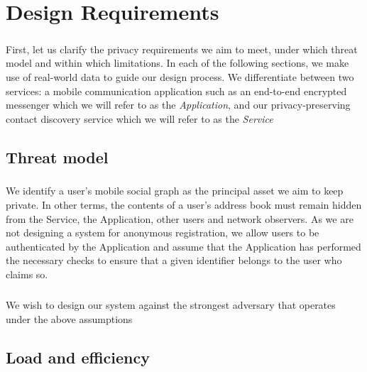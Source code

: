 \chapter{Design Requirements}

\paragraph{} First, let us clarify the privacy requirements we aim to meet, under which threat model and within which limitations. In each of the following sections, we make use of real-world data to guide our design process. We differentiate between two services: a mobile communication application such as an end-to-end encrypted messenger which we will refer to as the \textit{Application}, and our privacy-preserving contact discovery service which we will refer to as the \textit{Service}

\section{Threat model}

\paragraph{} We identify a user's mobile social graph as the principal asset we aim to keep private. In other terms, the contents of a user's address book must remain hidden from the Service, the Application, other users and network observers. As we are not designing a system for anonymous registration, we allow users to be authenticated by the Application and assume that the Application has performed the necessary checks to ensure that a given identifier belongs to the user who claims so. 

\paragraph{} We wish to design our system against the strongest adversary that operates under the above assumptions
	

\section{Load and efficiency}
